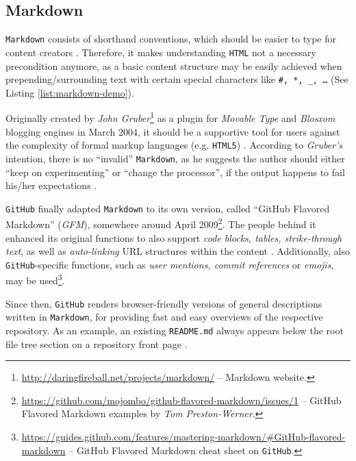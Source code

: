 \subsection{Markdown}
\label{sec:buildpipelines-markdown}



\texttt{Markdown} consists of shorthand conventions, which should be easier to type for content creators  \cite[38]{dhillon2016}.
Therefore, it makes understanding \texttt{HTML} not a necessary precondition anymore, as a basic content structure may be easily achieved when prepending/surrounding text with certain special characters like \texttt{\#, *, \_, \ldots} (See Listing \ref{list:markdown-demo}).

Originally created by \emph{John Gruber}\footnote{\url{http://daringfireball.net/projects/markdown/} -- Markdown website.} as a plugin for \emph{Movable Type} and \emph{Blosxom} blogging engines \cite{Markdown2004introduction} in March 2004, it should be a supportive tool for users against the complexity of formal markup languages (e.g. \texttt{HTML5}) \cite[4]{RFC7764}. According to \emph{Gruber's} intention, there is no ``invalid'' \texttt{Markdown}, as he suggests the author should either ``keep on experimenting'' or ``change the processor'', if the output happens to fail his/her expectations \cite[5]{RFC7764}.

\texttt{GitHub} finally adapted \texttt{Markdown} to its own version, called ``GitHub Flavored Markdown'' (\emph{GFM}), somewhere around April 2009\footnote{\url{https://github.com/mojombo/github-flavored-markdown/issues/1} -- GitHub Flavored Markdown examples by \emph{Tom Preston-Werner}.}. The people behind it enhanced its original functions to also support \emph{code blocks, tables, strike-through text}, as well as \emph{auto-linking} URL structures within the content \cite[18]{RFC7764}. Additionally, also \texttt{GitHub}-specific functions, such as \emph{user mentions, commit references} or \emph{emojis}, may be used\footnote{\url{https://guides.github.com/features/mastering-markdown/\#GitHub-flavored-markdown} -- GitHub Flavored Markdown cheat sheet on \texttt{GitHub}.}.

Since then, \texttt{GitHub} renders browser-friendly versions of general descriptions written in \texttt{Markdown}, for providing fast and easy overviews of the respective repository. As an example, an existing \texttt{README.md} always appears below the root file tree section on a repository front page \cite[5]{gandrud2013github}.
